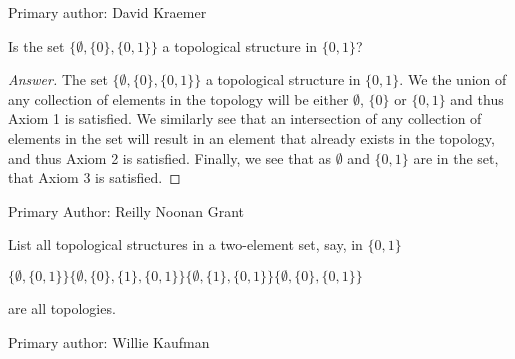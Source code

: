   Primary author: David Kraemer

\begin{minorEx} %
  Is the set $\{ \emptyset, \{ 0 \}, \{0,1\} \}$ a topological
  structure in $\{ 0, 1\}$?
\end{minorEx}

\begin{proof}[Answer]
The set $\{ \emptyset, \{ 0 \}, \{0,1\} \}$ a topological
  structure in $\{ 0, 1\}$. We the union of any collection of elements
  in the topology will be either $\emptyset$, $\{0\}$ or $\{0,1\}$ and 
  thus Axiom 1 is satisfied. We similarly see that an intersection of
  any collection of elements in the set will result in an element that
  already exists in the topology, and thus Axiom 2 is
  satisfied. Finally, we see that as $\emptyset$ and $\{0,1\}$ are in
  the set, that Axiom 3 is satisfied.
\end{proof}

Primary Author: Reilly Noonan Grant

\begin{minorEx} %
  List all topological structures in a two-element set, say, in $\{0 , 1\}$
\end{minorEx}

$\{\emptyset, \{0, 1\}\}
\{\emptyset, \{0\}, \{1\}, \{0, 1\}\}
\{\emptyset, \{1\}, \{0, 1\}\}
\{\emptyset, \{0\}, \{0, 1\}\}$

are all topologies.

Primary author: Willie Kaufman







